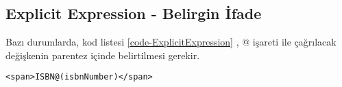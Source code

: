 \documentclass[10pt,a4paper]{article}
\begin{document}
\subsection{Explicit Expression - Belirgin İfade }
Bazı durumlarda, kod listesi \ref{code-ExplicitExpression} , 
@ işareti ile çağrılacak değişkenin parentez içinde belirtilmesi gerekir.


\begin{lstlisting}[label=code-ExplicitExpression,caption=Belirgin İfade  ]
<span>ISBN@(isbnNumber)</span>
\end{lstlisting}






% 

\end{document}
